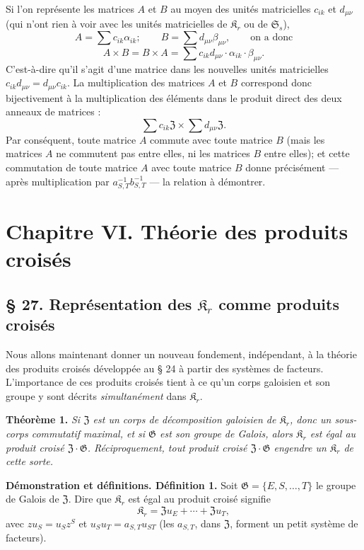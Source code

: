 Si l'on représente les matrices \(A\) et \(B\) au moyen des unités matricielles \(c_{ik}\) et \(d_{\mu\nu}\) (qui n'ont rien à voir avec les unités matricielles de \(\mathfrak K_r\) ou de \(\mathfrak S_s\)),
\[
A=\sum c_{ik}\alpha_{ik};\qquad
B=\sum d_{\mu\nu}\beta_{\mu\nu},\qquad\text{on a donc}
\]
\[
A\times B=B\times A
=\sum c_{ik}d_{\mu\nu}\cdot\alpha_{ik}\cdot\beta_{\mu\nu}.
\]
C'est-à-dire qu'il s'agit d'une matrice dans les nouvelles unités matricielles \(c_{ik}d_{\mu\nu}=d_{\mu\nu}c_{ik}\). La multiplication des matrices \(A\) et \(B\) correspond donc bijectivement à la multiplication des éléments dans le produit direct des deux anneaux de matrices :
\[
\sum c_{ik}\mathfrak Z\times\sum d_{\mu\nu}\mathfrak Z.
\]
Par conséquent, toute matrice \(A\) commute avec toute matrice \(B\) (mais les matrices \(A\) ne commutent pas entre elles, ni les matrices \(B\) entre elles); et cette commutation de toute matrice \(A\) avec toute matrice \(B\) donne précisément --- après multiplication par \(a_{S,T}^{-1}b_{S,T}^{-1}\) --- la relation à démontrer.

\section*{Chapitre VI. Théorie des produits croisés}\label{fr-r823-chapitre-vi-theorie-produits-croises}

\subsection*{\S{} 27. Représentation des \(\mathfrak K_r\) comme produits croisés}\label{fr-r823-representation-produits-croises}

Nous allons maintenant donner un nouveau fondement, indépendant, à la théorie des produits croisés développée au \S{} 24 à partir des systèmes de facteurs. L'importance de ces produits croisés tient à ce qu'un corps galoisien et son groupe y sont décrits \emph{simultanément} dans \(\mathfrak K_r\).

\noindent\textbf{Théorème 1.} \emph{Si \(\mathfrak Z\) est un corps de décomposition galoisien de \(\mathfrak K_r\), donc un sous-corps commutatif maximal, et si \(\mathfrak G\) est son groupe de Galois, alors \(\mathfrak K_r\) est égal au produit croisé \(\mathfrak Z\cdot\mathfrak G\). Réciproquement, tout produit croisé \(\mathfrak Z\cdot\mathfrak G\) engendre un \(\mathfrak K_r\) de cette sorte.}

\noindent\textbf{Démonstration et définitions. Définition 1.} Soit \(\mathfrak G=\{E,S,\ldots,T\}\) le groupe de Galois de \(\mathfrak Z\). Dire que \(\mathfrak K_r\) est égal au produit croisé signifie
\[
\mathfrak K_r=\mathfrak Zu_E+\cdots+\mathfrak Zu_T,
\]
avec \(zu_S=u_Sz^S\) et \(u_Su_T=a_{S,T}u_{ST}\) (les \(a_{S,T}\), dans \(\mathfrak Z\), forment un petit système de facteurs).

